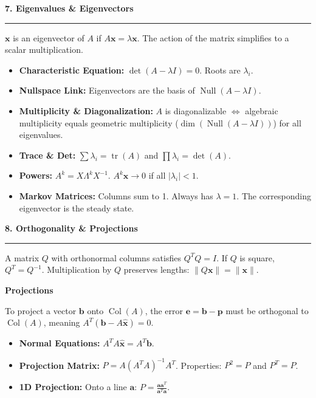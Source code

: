 \documentclass[10pt, landscape, twocolumn]{article}
\newcommand{\cheatsheetsection}[1]{
    \vspace{0.6em}
    {\color{themeblue}\large\bfseries #1} \par
    \vspace{-0.5em}
    {\color{themeblue}\rule{\linewidth}{1pt}} \par
    \vspace{0.2em}
}
\newcommand{\cheatsheetsubsection}[1]{
    \vspace{0.4em}
    {\color{themeblue}\normalsize\bfseries #1} \par
    \vspace{0.1em}
}
\begin{document}
\cheatsheetsection{7. Eigenvalues \& Eigenvectors}
$\mathbf{x}$ is an eigenvector of $A$ if $A\mathbf{x} = \lambda \mathbf{x}$. The action of the matrix simplifies to a scalar multiplication.
\begin{itemize}[leftmargin=*, itemsep=4pt, parsep=0pt]
    \item \textbf{Characteristic Equation:} $\det(A - \lambda I) = 0$. Roots are $\lambda_i$.
    \item \textbf{Nullspace Link:} Eigenvectors are the basis of $\operatorname{Null}(A - \lambda I)$.
    \item \textbf{Multiplicity \& Diagonalization:} $A$ is diagonalizable $\iff$ algebraic multiplicity equals geometric multiplicity ($\dim(\operatorname{Null}(A - \lambda I))$) for all eigenvalues.
    \item \textbf{Trace \& Det:} $\sum \lambda_i = \operatorname{tr}(A)$ and $\prod \lambda_i = \det(A)$.
    \item \textbf{Powers:} $A^k = X \Lambda^k X^{-1}$. $A^k \mathbf{x} \to 0$ if all $|\lambda_i| < 1$.
    \item \textbf{Markov Matrices:} Columns sum to 1. Always has $\lambda = 1$. The corresponding eigenvector is the steady state.
\end{itemize}

\cheatsheetsection{8. Orthogonality \& Projections}
A matrix $Q$ with orthonormal columns satisfies $Q^T Q = I$. If $Q$ is square, $Q^T = Q^{-1}$. Multiplication by $Q$ preserves lengths: $\|Q\mathbf{x}\| = \|\mathbf{x}\|$.

\cheatsheetsubsection{Projections}
To project a vector $\mathbf{b}$ onto $\operatorname{Col}(A)$, the error $\mathbf{e} = \mathbf{b} - \mathbf{p}$ must be orthogonal to $\operatorname{Col}(A)$, meaning $A^T(\mathbf{b} - A\hat{\mathbf{x}}) = 0$.
\begin{itemize}[leftmargin=*, itemsep=4pt, parsep=0pt]
    \item \textbf{Normal Equations:} $A^T A \hat{\mathbf{x}} = A^T \mathbf{b}$.
    \item \textbf{Projection Matrix:} $P = A(A^T A)^{-1}A^T$. Properties: $P^2 = P$ and $P^T = P$.
    \item \textbf{1D Projection:} Onto a line $\mathbf{a}$: $P = \frac{\mathbf{a}\mathbf{a}^T}{\mathbf{a}^T \mathbf{a}}$.
\end{itemize}
\end{document}
